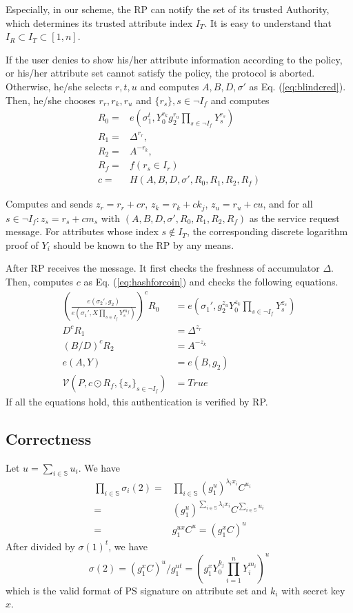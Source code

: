 \documentclass[journal]{IEEEtran}
\begin{document}
Especially, in our scheme, the RP can notify the set of its trusted Authority, which determines its trusted attribute index $I_T$. It is easy to understand that $I_R\subset I_T \subset [1, n]$. 

If the user denies to show his/her attribute information according to the policy, or his/her attribute set cannot satisfy the policy, the protocol is aborted. 
Otherwise, he/she selects $r, t, u$ and computes $A, B, D, \sigma'$ as Eq. (\ref{eq:blindcred}). Then, he/she chooses $r_r, r_k, r_u$ and $\{r_s\}, s\in \lnot I_f$ and computes 
\begin{align}
R_0 =& e(\sigma_1^t, Y_0^{r_k}g_2^{r_u}\prod_{s \in \lnot I_f} Y_s^{r_s}) \\
R_1 =& \Delta^{r_r},\\
R_2 =& A ^{-r_k},\\
R_f =& f(r_s\in I_r)\\
c = & H(A, B, D, \sigma', R_0, R_1, R_2, R_f) \label{eq:hashforcoin}
\end{align}

Computes and sends $z_r = r_r + cr$, $z_k = r_k + ck_j$, $z_u = r_u + cu$, and for all $s\in \lnot I_f: z_s = r_s + c m_s$ with $(A, B, D, \sigma', R_0, R_1, R_2, R_f)$ as the service request message. For attributes whose index $s\notin I_T$, the corresponding discrete logarithm proof of $Y_i$ should be known to the RP by any means.

After RP receives the message. It first checks the freshness of accumulator $\Delta$. Then, computes $c$ as Eq. (\ref{eq:hashforcoin}) and checks the following equations.
\begin{align}
(\frac{e(\sigma_2', g_2)}{e(\sigma_1', X\prod_{s \in I_f}Y_s^{m_f} )})^c R_0 & = e(\sigma_1', g_2^{z_u}Y_0^{z_k}\prod_{s \in \lnot I_f}Y_s^{z_s})\nonumber \\
D^c R_1 & = \Delta^{z_r} \\
(B/D)^c R_2 & = A^{-z_k} \\
e(A, Y) &= e(B, g_2) \\
\mathcal{V}(P, c\odot R_f, \{z_s\}_{s\in\lnot I_f}) &= True
\end{align}
If all the equations hold, this authentication is verified by RP.
\subsection{Correctness}
Let $u = \sum_{i\in\mathbb{S}}u_i $. We have 
\begin{align}
\prod_{i\in \mathbb{S}}\sigma_i(2) = &\prod_{i\in \mathbb{S}}(g_1^u)^{\lambda_i x_i}C^{u_i} \\
=& (g_1^u)^{\sum_{i\in\mathbb{S}}\lambda_i x_i} C^{\sum_{i\in\mathbb{S}}u_i}\\
=& g_1^{ux}C^u = (g_1^xC)^u
\end{align}
After divided by $\sigma(1)^t$, we have
$$\sigma(2) = (g_1^xC)^u/g_1^{ut} = (g_1^x Y_0^{k_j}\prod_{i=1}^nY_i^{m_i})^u$$
which is the valid format of PS signature on attribute set and $k_i$ with secret key $x$.
\end{document}
